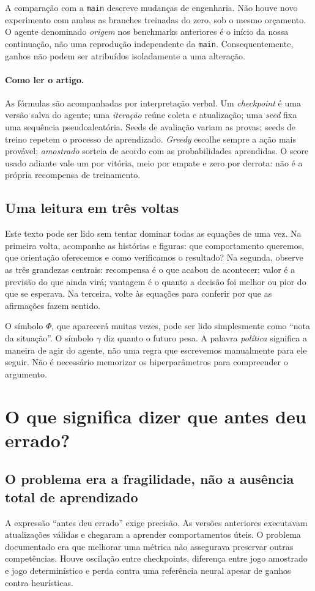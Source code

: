 \documentclass[11pt,a4paper]{article}
\newcommand{\code}[1]{\nolinkurl{#1}}
\begin{document}
A comparação com a \code{main} descreve mudanças de engenharia. Não houve novo experimento com ambas as branches treinadas do zero, sob o mesmo orçamento. O agente denominado \emph{origem} nos benchmarks anteriores é o início da nossa continuação, não uma reprodução independente da \code{main}. Consequentemente, ganhos não podem ser atribuídos isoladamente a uma alteração.


\paragraph{Como ler o artigo.}
As fórmulas são acompanhadas por interpretação verbal. Um \emph{checkpoint} é uma versão salva do agente; uma \emph{iteração} reúne coleta e atualização; uma \emph{seed} fixa uma sequência pseudoaleatória. Seeds de avaliação variam as provas; seeds de treino repetem o processo de aprendizado. \emph{Greedy} escolhe sempre a ação mais provável; \emph{amostrado} sorteia de acordo com as probabilidades aprendidas. O score usado adiante vale um por vitória, meio por empate e zero por derrota: não é a própria recompensa de treinamento.


\subsection*{Uma leitura em três voltas}
Este texto pode ser lido sem tentar dominar todas as equações de uma vez. Na primeira volta, acompanhe as histórias e figuras: que comportamento queremos, que orientação oferecemos e como verificamos o resultado? Na segunda, observe as três grandezas centrais: recompensa é o que acabou de acontecer; valor é a previsão do que ainda virá; vantagem é o quanto a decisão foi melhor ou pior do que se esperava. Na terceira, volte às equações para conferir por que as afirmações fazem sentido.

O símbolo $\Phi$, que aparecerá muitas vezes, pode ser lido simplesmente como ``nota da situação''. O símbolo $\gamma$ diz quanto o futuro pesa. A palavra \emph{política} significa a maneira de agir do agente, não uma regra que escrevemos manualmente para ele seguir. Não é necessário memorizar os hiperparâmetros para compreender o argumento.

\section{O que significa dizer que antes deu errado?}
\subsection{O problema era a fragilidade, não a ausência total de aprendizado}
A expressão ``antes deu errado'' exige precisão. As versões anteriores executavam atualizações válidas e chegaram a aprender comportamentos úteis. O problema documentado era que melhorar uma métrica não assegurava preservar outras competências. Houve oscilação entre checkpoints, diferença entre jogo amostrado e jogo determinístico e perda contra uma referência neural apesar de ganhos contra heurísticas.
\end{document}
